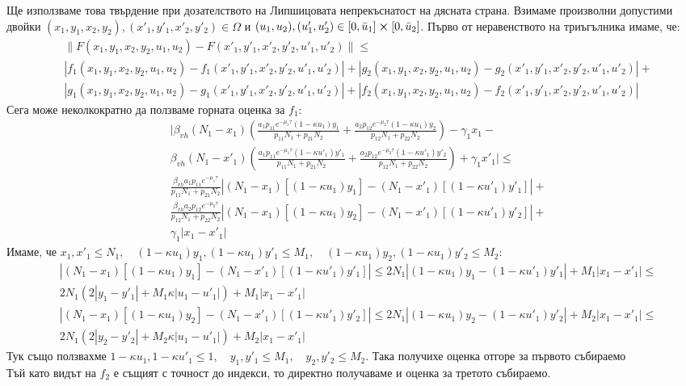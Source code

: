 Ще използваме това твърдение при дозателството на Липшицовата непрекъснатост на дясната страна. Взимаме произволни допустими двойки $(x_1, y_1, x_2, y_2), (x'_1, y'_1, x'_2, y'_2) \in \Omega$ и $(u_1, u_2), (u'_1, u'_2) \in [0, \bar{u}_1] \cross [0, \bar{u}_2]$.
Първо от неравенството на триъгълника имаме, че:
\begin{align*}
  &\|F(x_1, y_1, x_2, y_2, u_1, u_2) - F(x'_1, y'_1, x'_2, y'_2, u'_1, u'_2)\| \leq \\
  &|f_1(x_1, y_1, x_2, y_2, u_1, u_2) - f_1(x'_1, y'_1, x'_2, y'_2, u'_1, u'_2)| + |g_2(x_1, y_1, x_2, y_2, u_1, u_2) - g_2(x'_1, y'_1, x'_2, y'_2, u'_1, u'_2)| + \\
  &|g_1(x_1, y_1, x_2, y_2, u_1, u_2) - g_1(x'_1, y'_1, x'_2, y'_2, u'_1, u'_2)| + |f_2(x_1, y_1, x_2, y_2, u_1, u_2) - f_2(x'_1, y'_1, x'_2, y'_2, u'_1, u'_2)|
\end{align*}
Сега може неколкократно да ползваме горната оценка за $f_1$:
\begin{align*}
  &\bigg|\beta_{vh} (N_1-x_1) \left(\frac{a_1 p_{11} e^{-\mu_1 \tau} (1-\kappa u_1) y_1}{p_{11} N_1 + p_{21} N_2} + \frac{a_2 p_{12} e^{-\mu_2 \tau} (1-\kappa u_1) y_2}{p_{12} N_1 + p_{22} N_2 }\right) - \gamma_1 x_1 - \\
  &\beta_{vh} (N_1-x'_1) \left(\frac{a_1 p_{11} e^{-\mu_1 \tau} (1-\kappa u'_1) y'_1}{p_{11} N_1 + p_{21} N_2} + \frac{a_2 p_{12} e^{-\mu_2 \tau} (1-\kappa u'_1) y'_2}{p_{12} N_1 + p_{22} N_2 }\right) + \gamma_1 x'_1\bigg| \leq \\
  &\frac{\beta_{vh} a_1 p_{11} e^{-\mu_1 \tau}}{p_{11} N_1 + p_{21} N_2} \left|(N_1-x_1) [(1-\kappa u_1) y_1] - (N_1-x'_1) [(1-\kappa u'_1) y'_1]\right| + \\
  &\frac{\beta_{vh} a_2 p_{12} e^{-\mu_2 \tau}}{p_{12} N_1 + p_{22} N_2} \left|(N_1-x_1) [(1-\kappa u_1) y_2] - (N_1-x'_1) [(1-\kappa u'_1) y'_2]\right| + \\
  &\gamma_1 |x_1-x'_1|
\end{align*}
Имаме, че $x_1, x'_1 \leq N_1, \quad (1-\kappa u_1)y_1, (1-\kappa u_1) y'_1 \leq M_1, \quad (1-\kappa u_1)y_2, (1-\kappa u_1) y'_2 \leq M_2$:
\begin{align*}
  &\left|(N_1-x_1) [(1-\kappa u_1) y_1] - (N_1-x'_1) [(1-\kappa u'_1) y'_1]\right| \leq 2 N_1 |(1-\kappa u_1) y_1 - (1-\kappa u'_1) y'_1| + M_1 |x_1 - x'_1| \leq \\
  &2 N_1 (2|y_1 - y'_1| + M_1 \kappa |u_1 - u'_1|) + M_1 |x_1 - x'_1| \\
  &\left|(N_1-x_1) [(1-\kappa u_1) y_2] - (N_1-x'_1) [(1-\kappa u'_1) y'_2]\right| \leq 2 N_1 |(1-\kappa u_1) y_2 - (1-\kappa u'_1) y'_2| + M_2 |x_1 - x'_1| \leq \\
  &2 N_1 (2|y_2 - y'_2| + M_2 \kappa |u_1 - u'_1|) + M_2 |x_1 - x'_1|
\end{align*}
Тук също ползвахме $1-\kappa u_1, 1-\kappa u'_1 \leq 1, \quad y_1, y'_1 \leq M_1, \quad y_2, y'_2 \leq M_2$. Така получихе оценка отгоре за първото събираемо \\
Тъй като видът на $f_2$ е същият с точност до индекси, то директно получаваме и оценка за третото събираемо. \\

